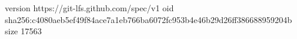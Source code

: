 version https://git-lfs.github.com/spec/v1
oid sha256:c4080aeb5ef49f84ace7a1eb766ba6072fc953b4e46b29d26ff386688959204b
size 17563
